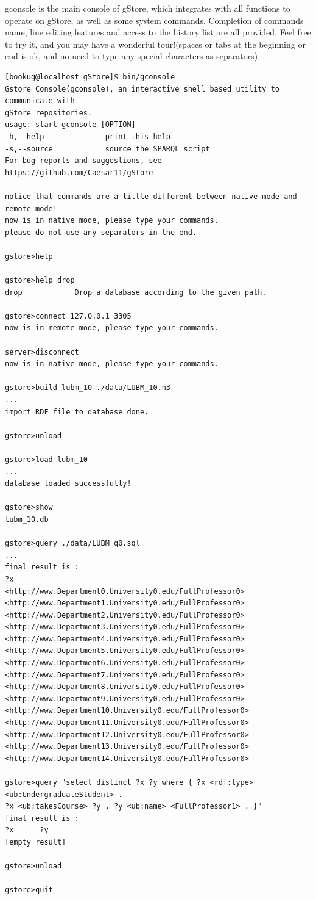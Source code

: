 \documentclass[titlepage, a4paper, 12pt]{article}
\begin{document}
gconsole is the main console of gStore, which integrates with all functions to operate on gStore, as well as some system commands.  Completion of commands name, line editing features and access to the history list are all provided. Feel free to try it, and you may have a wonderful tour!(spaces or tabs at the beginning or end is ok, and no need to type any special characters as separators)

\begin{verbatim}
[bookug@localhost gStore]$ bin/gconsole
Gstore Console(gconsole), an interactive shell based utility to communicate with
gStore repositories.
usage: start-gconsole [OPTION]
-h,--help              print this help
-s,--source            source the SPARQL script
For bug reports and suggestions, see https://github.com/Caesar11/gStore

notice that commands are a little different between native mode and remote mode!
now is in native mode, please type your commands.
please do not use any separators in the end.

gstore>help

gstore>help drop
drop            Drop a database according to the given path.

gstore>connect 127.0.0.1 3305
now is in remote mode, please type your commands.

server>disconnect
now is in native mode, please type your commands.

gstore>build lubm_10 ./data/LUBM_10.n3
...
import RDF file to database done.

gstore>unload

gstore>load lubm_10
...
database loaded successfully!

gstore>show
lubm_10.db

gstore>query ./data/LUBM_q0.sql
...
final result is :
?x
<http://www.Department0.University0.edu/FullProfessor0>
<http://www.Department1.University0.edu/FullProfessor0>
<http://www.Department2.University0.edu/FullProfessor0>
<http://www.Department3.University0.edu/FullProfessor0>
<http://www.Department4.University0.edu/FullProfessor0>
<http://www.Department5.University0.edu/FullProfessor0>
<http://www.Department6.University0.edu/FullProfessor0>
<http://www.Department7.University0.edu/FullProfessor0>
<http://www.Department8.University0.edu/FullProfessor0>
<http://www.Department9.University0.edu/FullProfessor0>
<http://www.Department10.University0.edu/FullProfessor0>
<http://www.Department11.University0.edu/FullProfessor0>
<http://www.Department12.University0.edu/FullProfessor0>
<http://www.Department13.University0.edu/FullProfessor0>
<http://www.Department14.University0.edu/FullProfessor0>

gstore>query "select distinct ?x ?y where { ?x <rdf:type>
<ub:UndergraduateStudent> .
?x <ub:takesCourse> ?y . ?y <ub:name> <FullProfessor1> . }"
final result is :
?x      ?y
[empty result]

gstore>unload

gstore>quit
\end{verbatim}
\end{document}
